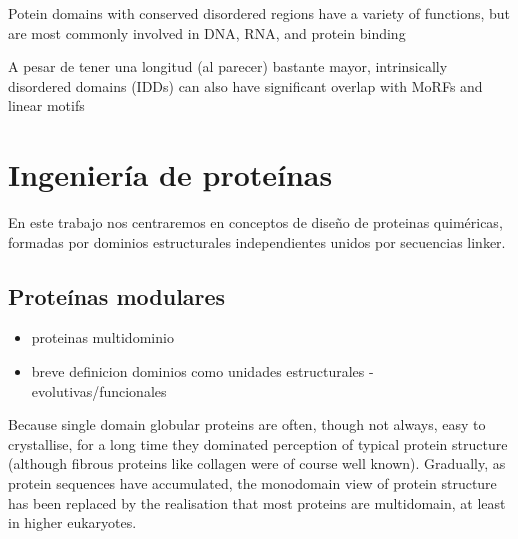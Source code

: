Potein domains with conserved disordered regions have a variety of functions, but are most commonly involved in DNA, RNA, and protein binding

A pesar de tener una longitud (al parecer) bastante mayor, intrinsically disordered domains (IDDs) can also have significant overlap with MoRFs and linear motifs


















































\section{Ingeniería de proteínas}
\label{proteinEngineering}


En este trabajo nos centraremos en conceptos de diseño de proteinas quiméricas, formadas por dominios estructurales independientes unidos por secuencias linker.





\subsection{Proteínas modulares}
\begin{itemize}
 \item proteinas multidominio
 \item breve definicion dominios como unidades estructurales - evolutivas/funcionales
\end{itemize}


Because single domain globular proteins are often, though not always, easy to crystallise, for a long time they dominated perception of typical protein structure (although fibrous proteins like collagen were of course well known).
Gradually, as protein sequences have accumulated, the monodomain view of protein structure has been replaced by the realisation that most proteins are multidomain, at least in higher eukaryotes.



